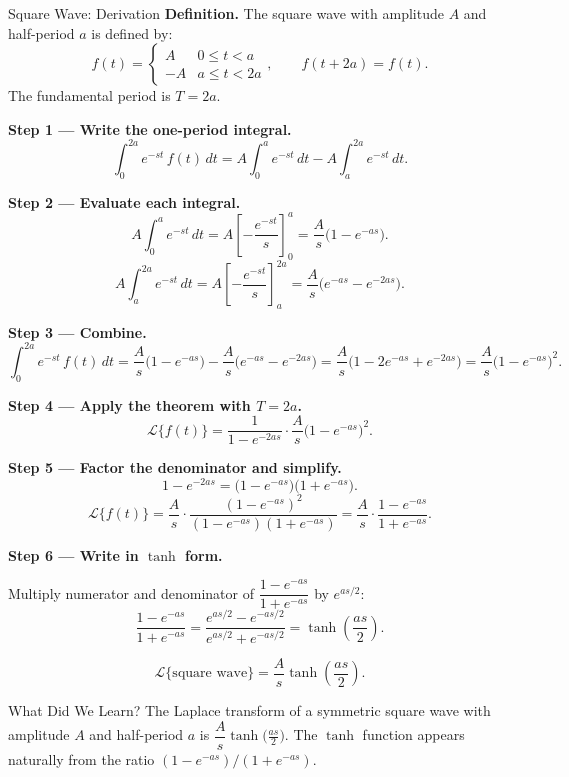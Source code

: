 \documentclass[12pt,a4paper]{article}
\begin{document}
\begin{infobox}{Square Wave: Derivation}
\textbf{Definition.}  The square wave with amplitude $A$ and half-period $a$
is defined by:
\[
  f(t) =
  \begin{cases}
    A  & 0 \leq t < a \\
    -A & a \leq t < 2a
  \end{cases}, \qquad f(t + 2a) = f(t).
\]
The fundamental period is $T = 2a$.

\textbf{Step 1 --- Write the one-period integral.}
\[
  \int_0^{2a} e^{-st}\,f(t)\,dt
  = A\int_0^a e^{-st}\,dt - A\int_a^{2a} e^{-st}\,dt.
\]

\textbf{Step 2 --- Evaluate each integral.}
\[
  A\int_0^a e^{-st}\,dt
  = A\left[-\frac{e^{-st}}{s}\right]_0^a
  = \frac{A}{s}\bigl(1 - e^{-as}\bigr).
\]
\[
  A\int_a^{2a} e^{-st}\,dt
  = A\left[-\frac{e^{-st}}{s}\right]_a^{2a}
  = \frac{A}{s}\bigl(e^{-as} - e^{-2as}\bigr).
\]

\textbf{Step 3 --- Combine.}
\[
  \int_0^{2a} e^{-st}\,f(t)\,dt
  = \frac{A}{s}\bigl(1 - e^{-as}\bigr) - \frac{A}{s}\bigl(e^{-as} - e^{-2as}\bigr)
  = \frac{A}{s}\bigl(1 - 2e^{-as} + e^{-2as}\bigr)
  = \frac{A}{s}\bigl(1 - e^{-as}\bigr)^2.
\]

\textbf{Step 4 --- Apply the theorem with $T = 2a$.}
\[
  \mathcal{L}\{f(t)\}
  = \frac{1}{1 - e^{-2as}} \cdot \frac{A}{s}\bigl(1 - e^{-as}\bigr)^2.
\]

\textbf{Step 5 --- Factor the denominator and simplify.}
\[
  1 - e^{-2as} = \bigl(1 - e^{-as}\bigr)\bigl(1 + e^{-as}\bigr).
\]
\[
  \mathcal{L}\{f(t)\}
  = \frac{A}{s} \cdot \frac{(1-e^{-as})^2}{(1-e^{-as})(1+e^{-as})}
  = \frac{A}{s} \cdot \frac{1-e^{-as}}{1+e^{-as}}.
\]

\textbf{Step 6 --- Write in $\tanh$ form.}

Multiply numerator and denominator of $\dfrac{1-e^{-as}}{1+e^{-as}}$ by
$e^{as/2}$:
\[
  \frac{1-e^{-as}}{1+e^{-as}}
  = \frac{e^{as/2} - e^{-as/2}}{e^{as/2} + e^{-as/2}}
  = \tanh\!\left(\frac{as}{2}\right).
\]

\[
  \boxed{\mathcal{L}\{\text{square wave}\}
  = \frac{A}{s}\tanh\!\left(\frac{as}{2}\right).}
\]
\end{infobox}

\begin{learnbox}{What Did We Learn?}
The Laplace transform of a symmetric square wave with amplitude $A$ and
half-period $a$ is $\dfrac{A}{s}\tanh\!\bigl(\tfrac{as}{2}\bigr)$.  The
$\tanh$ function appears naturally from the ratio $(1-e^{-as})/(1+e^{-as})$.
\end{learnbox}
\end{document}

